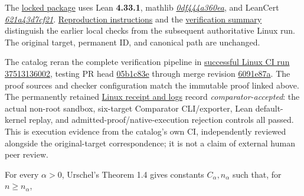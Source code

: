 \documentclass[11pt,a4paper]{article}
\makeatletter
\renewcommand{\subsection}{\Needspace{4\baselineskip}\@startsection{subsection}{2}{0pt}{9pt plus 1pt minus 1pt}{3pt}{\sffamily\bfseries\normalsize\color{ink}}}
\makeatother
\begin{document}
The
\href{https://github.com/ajt60gaibb/OpenProblemsInNLA/blob/263a215acd295a260dec7a75ff6bebebb9789df9/linear-systems-and-elimination/IE-06/lean/lake-manifest.json}{locked
package} uses Lean \textbf{4.33.1}, mathlib
\href{https://github.com/leanprover-community/mathlib4/commit/0df444a360eaa60ab8c11dca51a86af692955474}{\textit{0df444a360ea}},
and LeanCert
\href{https://github.com/alerad/leancert/commit/621a43d7cf21f87872392a01e874f2f1dbddc926}{\textit{621a43d7cf21}}.
\href{https://github.com/ajt60gaibb/OpenProblemsInNLA/blob/main/linear-systems-and-elimination/IE-06/lean/INFRASTRUCTURE.md}{Reproduction
instructions} and the
\href{https://github.com/ajt60gaibb/OpenProblemsInNLA/blob/main/linear-systems-and-elimination/IE-06/lean/verification/SUMMARY.md}{verification
summary} distinguish the earlier local checks from the subsequent
authoritative Linux run. The original target, permanent ID, and
canonical path are unchanged.

The catalog reran the complete verification pipeline in
\href{https://github.com/ajt60gaibb/OpenProblemsInNLA/actions/runs/37513136002/job/112439363988}{successful
Linux CI run 37513136002}, testing PR head
\href{https://github.com/ajt60gaibb/OpenProblemsInNLA/commit/05b1c83e11042d7067cd51c5a4bfc0265e7390f4}{05b1c83e}
through merge revision
\href{https://github.com/ajt60gaibb/OpenProblemsInNLA/commit/6091e87aa8538ea31df21fd06cce3d9e42f65c2a}{6091e87a}.
The proof sources and checker configuration match the immutable proof
linked above. The permanently retained
\href{https://github.com/ajt60gaibb/OpenProblemsInNLA/blob/main/linear-systems-and-elimination/IE-06/lean/verification/linux-ci-2026-10-06/README.md}{Linux
receipt and logs} record \textit{comparator-accepted}: the actual
non-root sandbox, six-target Comparator CLI/exporter, Lean
default-kernel replay, and admitted-proof/native-execution rejection
controls all passed. This is execution evidence from the catalog's own
CI, independently reviewed alongside the original-target correspondence;
it is not a claim of external human peer review.

\newpage

\subsection{Scope of the resolution}\label{scope-of-the-resolution}

For every \(\alpha>0\), Urschel's Theorem 1.4 gives constants
\(C_\alpha,n_\alpha\) such that, for \(n\ge n_\alpha\),
\end{document}
